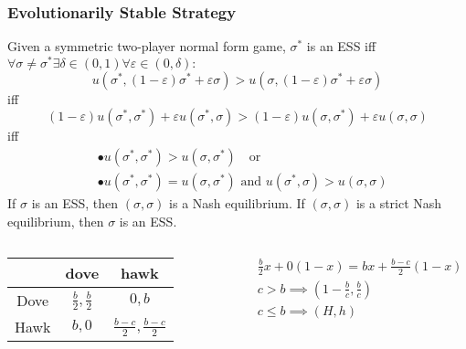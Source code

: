 \documentclass[UTF8,11pt,colorlinks,compress,openany]{beamer}%
\begin{document}
\begin{frame}\frametitle{Evolutionarily Stable Strategy}
Given a symmetric two-player normal form game, $\sigma^*$ is an ESS iff $\forall \sigma\neq \sigma^*\exists\delta\in(0,1)\forall\varepsilon\in(0,\delta):$
	\[u\left(\sigma^*,(1-\varepsilon)\sigma^*+\varepsilon \sigma\right)>u\left(\sigma,(1-\varepsilon)\sigma^*+\varepsilon \sigma\right)\]
	iff
	\[(1-\varepsilon)u\left(\sigma^*,\sigma^*\right)+\varepsilon u\left(\sigma^*,\sigma\right)>(1-\varepsilon)u\left(\sigma,\sigma^*\right)+\varepsilon u\left(\sigma,\sigma\right)\]
	iff
	\begin{align*}
	&\bullet u\left(\sigma^*,\sigma^*\right)>u\left(\sigma,\sigma^*\right)\quad\mbox{or}\\
	&\bullet u\left(\sigma^*,\sigma^*\right)=u\left(\sigma,\sigma^*\right)\mbox{ and } u\left(\sigma^*,\sigma\right)>u\left(\sigma,\sigma\right)
	\end{align*}
	If $\sigma$ is an ESS, then $(\sigma,\sigma)$ is a Nash equilibrium. If $(\sigma,\sigma)$ is a strict Nash equilibrium, then $\sigma$ is an ESS.
\begin{columns}
\begin{table}
\begin{tabu}{c|cc}
\hline
 & dove & hawk\\
\hline
Dove & $\frac{b}{2},\frac{b}{2}$ & $0,b$\\
Hawk & $b,0$ & $\frac{b-c}{2},\frac{b-c}{2}$\\
\hline
\end{tabu}
\end{table}
\vspace{-3ex}
\begin{align*}
&\frac{b}{2}x+0(1-x)=bx+\frac{b-c}{2}(1-x)\\
&c>b\implies(1-\frac{b}{c},\frac{b}{c})\\
&c\leq b\implies(H,h)
\end{align*}
\end{columns}
\end{frame}
\end{document}
